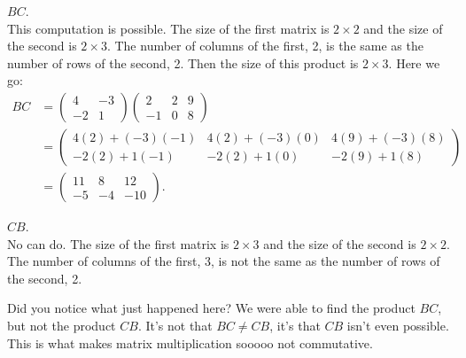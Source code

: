 \documentclass[12pt]{article}
\def\it{\item}
\def\lp{\left(} \def\rp{\right)} \def\abs#1{\vert #1 \vert}
\begin{document}
\it $BC$. \\
This computation is possible. The size of the first matrix is $2 \times 2$ and the size of the second is $2 \times 3$. The number of columns of the first, 2, is the same as the number of rows of the second, 2. Then the size of this product is $2 \times 3$. Here we go: 
\begin{align*}
BC &= \lp \begin{array}{rr} 4 & -3 \\ -2 & 1 \end{array} \rp
 \lp \begin{array}{rrr}  2 & 2 & 9 \\ -1 & 0 & 8 \end{array} \rp \\
 &= \begin{pmatrix} 4(2) + (-3)(-1) & 4(2) + (-3)(0) & 4(9) + (-3)(8) \\
                 -2(2) + 1(-1)   & -2(2) + 1(0)   & -2(9) + 1(8)
 \end{pmatrix} \\
 &=
 \lp \begin{array}{rrr} 11 & 8 & 12 \\ -5 & -4 & -10 \end{array} \rp.
\end{align*}

\it $CB$. \\
No can do. The size of the first matrix is $2 \times 3$ and the size of the second is $2 \times 2$. The number of columns of the first, 3, is not the same as the number of rows of the second, 2.

Did you notice what just happened here? We were able to find the product $BC$, but not the product $CB$. It's not that $BC \neq CB$, it's that $CB$ isn't even possible. This is what makes matrix multiplication sooooo not commutative.
\ee
\end{document}
